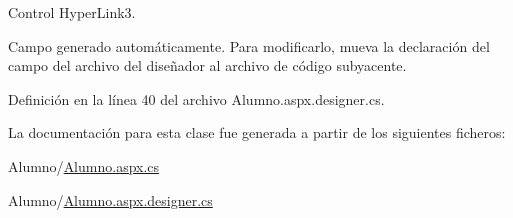 Control Hyper\+Link3. 

Campo generado automáticamente. Para modificarlo, mueva la declaración del campo del archivo del diseñador al archivo de código subyacente. 

Definición en la línea 40 del archivo Alumno.\+aspx.\+designer.\+cs.



La documentación para esta clase fue generada a partir de los siguientes ficheros\+:\begin{DoxyCompactItemize}
\item 
Alumno/\mbox{\hyperlink{Alumno_8aspx_8cs}{Alumno.\+aspx.\+cs}}\item 
Alumno/\mbox{\hyperlink{Alumno_8aspx_8designer_8cs}{Alumno.\+aspx.\+designer.\+cs}}\end{DoxyCompactItemize}
